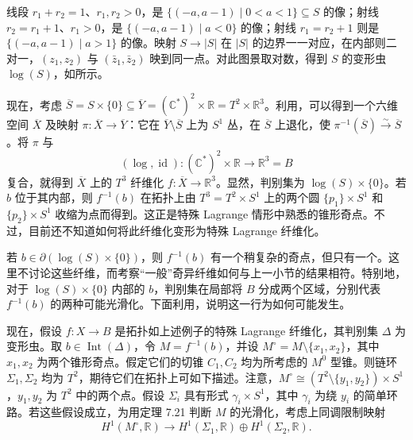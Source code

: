 线段 $r_1+r_2=1$、$r_1,r_2>0$，是 $\{(-a,a-1)\mid0<a<1\}\subseteq S$ 的像；射线 $r_2=r_1+1$、$r_1>0$，是 $\{(-a,a-1)\mid a<0\}$ 的像；射线 $r_1=r_2+1$ 则是 $\{(-a,a-1)\mid a>1\}$ 的像。映射 $S\to|S|$ 在 $|S|$ 的边界一一对应，在内部则二对一，$(z_1,z_2)$ 与 $(\bar z_1,\bar z_2)$ 映到同一点。对此图景取对数，得到 $S$ 的变形虫 $\log(S)$，如所示。
\begin{figure}[H]
\centering
{}
\BookNumberOnlyCaption\label{fig:7.8}
\end{figure}

现在，考虑 $\overline S=S\times\{0\}\subseteq\overline Y=(\mathbb C^*)^2\times\mathbb R=T^2\times\mathbb R^3$。利用，可以得到一个六维空间 $\overline X$ 及映射 $\pi\colon\overline X\to\overline Y$：它在 $\overline Y\setminus\overline S$ 上为 $S^1$ 丛，在 $\overline S$ 上退化，使 $\pi^{-1}(\overline S)\xrightarrow{\sim}\overline S$。将 $\pi$ 与
\[
(\log,\operatorname{id})\colon(\mathbb C^*)^2\times\mathbb R
\longrightarrow\mathbb R^3=B
\]
复合，就得到 $\overline X$ 上的 $T^3$ 纤维化 $f\colon\overline X\to\mathbb R^3$。显然，判别集为 $\log(S)\times\{0\}$。若 $b$ 位于其内部，则 $f^{-1}(b)$ 在拓扑上由 $T^3=T^2\times S^1$ 上的两个圆 $\{p_1\}\times S^1$ 和 $\{p_2\}\times S^1$ 收缩为点而得到。这正是特殊 Lagrange 情形中熟悉的锥形奇点。不过，目前还不知道如何将此纤维化变形为特殊 Lagrange 纤维化。

若 $b\in\partial(\log(S)\times\{0\})$，则 $f^{-1}(b)$ 有一个稍复杂的奇点，但只有一个。这里不讨论这些纤维，而考察“一般”奇异纤维如何与上一小节的结果相符。特别地，对于 $\log(S)\times\{0\}$ 内部的 $b$，判别集在局部将 $B$ 分成两个区域，分别代表 $f^{-1}(b)$ 的两种可能光滑化。下面利用，说明这一行为如何可能发生。

现在，假设 $f\colon X\to B$ 是拓扑如上述例子的特殊 Lagrange 纤维化，其判别集 $\Delta$ 为变形虫。取 $b\in\operatorname{Int}(\Delta)$，令 $M=f^{-1}(b)$，并设 $M^\circ=M\setminus\{x_1,x_2\}$，其中 $x_1,x_2$ 为两个锥形奇点。假定它们的切锥 $C_1,C_2$ 均为所考虑的 $M^0$ 型锥。则链环 $\Sigma_1,\Sigma_2$ 均为 $T^2$，期待它们在拓扑上可如下描述。注意，$M^\circ\cong(T^2\setminus\{y_1,y_2\})\times S^1$，$y_1,y_2$ 为 $T^2$ 中的两个点。假设 $\Sigma_i$ 具有形式 $\gamma_i\times S^1$，其中 $\gamma_i$ 为绕 $y_i$ 的简单环路。若这些假设成立，为用定理 7.21 判断 $M$ 的光滑化，考虑上同调限制映射
\[
H^1(M^\circ,\mathbb R)\longrightarrow
H^1(\Sigma_1,\mathbb R)\oplus H^1(\Sigma_2,\mathbb R).
\]

